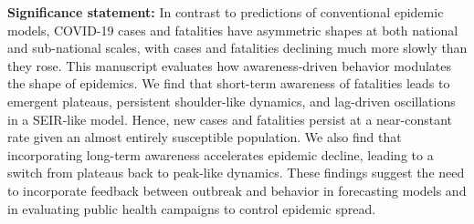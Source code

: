 \begin{boxit}
\noindent
\textbf{Significance statement:}
In contrast to predictions of conventional epidemic models,
COVID-19 cases and fatalities have asymmetric shapes at both national
and sub-national scales, with cases and fatalities 
declining much more slowly than they rose. This manuscript evaluates how awareness-driven
behavior modulates the shape of epidemics.
We find that short-term awareness of fatalities leads 
to emergent plateaus, persistent shoulder-like dynamics, and lag-driven
oscillations in a SEIR-like model.  
Hence, new cases and fatalities persist at 
a near-constant rate given an almost entirely susceptible population.
We also find that incorporating long-term awareness 
accelerates epidemic decline, leading to a switch from plateaus back to peak-like dynamics. 
These findings suggest the need to incorporate feedback
between outbreak and behavior in forecasting models and in evaluating public
health campaigns to control epidemic spread.
\end{boxit}
